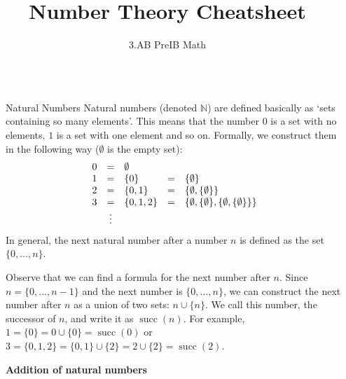 \documentclass[final]{beamer}
\title{Number Theory Cheatsheet}
\author{3.AB PreIB Math}
\institute[shortinst]{Adam Klepáč and Jáchym Löwenhöffer}
\newlength{\sepwidth}
\newlength{\colwidth}
\newcommand{\separatorcolumn}{\begin{column}{\sepwidth}\end{column}}
\newcommand{\N}{\mathbb{N}}
\DeclareMathOperator{\s}{succ}
\begin{document}

\begin{frame}[t]
\begin{columns}[t]
\separatorcolumn

\begin{column}{\colwidth}

 \begin{exampleblock}{Natural Numbers}
  Natural numbers (denoted $\N$) are defined basically as `\alert{sets
  containing so many elements}'. This means that the number $0$ is a set with no
  elements, $1$ is a set with one element and so on. Formally, we construct them
  in the following way ($\emptyset$ is the empty set):
  \[
   \begin{array}{r c l c l}
    0 & = & \emptyset & &\\
    1 & = & \{0\} & = & \{\emptyset\}\\
    2 & = & \{0, 1\} & = & \{\emptyset, \{\emptyset\}\}\\
    3 & = & \{0, 1, 2\} & = & \{\emptyset, \{\emptyset\}, \{\emptyset,
    \{\emptyset\}\}\}\\
      & \vdots & & & 
   \end{array}
  \]
  In general, the \alert{next natural number} after a number $n$ is defined as
  the set $\{0,\ldots,n\}$. 

  Observe that we can find a formula for the next number after $n$. Since $n =
  \{0,\ldots,n-1\}$ and the next number is $\{0,\ldots,n\}$, we can construct
  the next number after $n$ as a union of two sets: $n \cup \{n\}$. We call this
  number, the \alert{successor} of $n$, and write it as \alert{$\s(n)$}. For
  example, $1 = \{0\} = 0 \cup \{0\} = \s(0)$ or $3 = \{0,1,2\} = \{0,1\} \cup
  \{2\} = 2 \cup \{2\} = \s(2)$.

  \vspace{18pt}

  \textbf{\large Addition of natural numbers}


\end{exampleblock}
\end{column}
\end{columns}
\end{frame}
\end{document}

